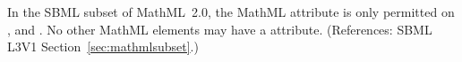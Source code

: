 In the SBML subset of MathML~2.0, the MathML attribute
 is only permitted on ,  and
.  No other MathML elements may have a
 attribute.  (References: SBML L3V1
Section~\ref{sec:mathmlsubset}.) 
